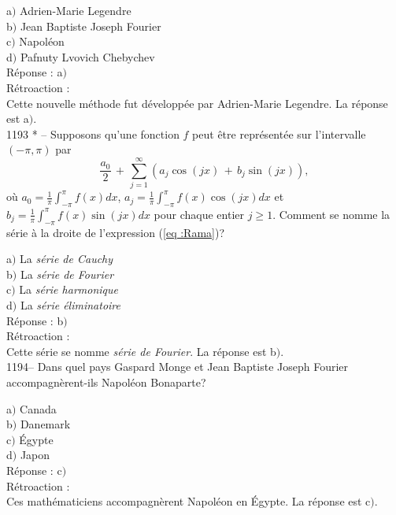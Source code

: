 ﻿\documentclass[letterpaper, 12pt]{article}
\begin{document}
a$)$ Adrien-Marie Legendre \\
b$)$ Jean Baptiste Joseph Fourier \\
c$)$ Napol\'eon \\
d$)$ Pafnuty Lvovich Chebychev\\

R\'eponse : a$)$\\

R\'etroaction : \\
Cette nouvelle m\'ethode fut d\'evelopp\'ee par Adrien-Marie
Legendre.
La r\'eponse est a$)$.\\

1193 * -- Supposons qu'une fonction $f$ peut \^etre repr\'esent\'ee
sur l'intervalle $(-\pi,\pi)$ par
\begin{equation}
\label{eq :Rama}
\displaystyle{\frac{a_0}2\,+\,\sum_{j=1}^{\infty}(a_j\cos(jx)\,+\,b_j\sin(jx)),}
\end{equation}
o\`u $\displaystyle{a_0=\frac1{\pi}\int_{-\pi}^{\pi}f(x)dx}$,
$\displaystyle{a_j=\frac1{\pi}\int_{-\pi}^{\pi}f(x)\cos(jx)dx}$ et
$\displaystyle{b_j=\frac1{\pi}\int_{-\pi}^{\pi}f(x)\sin(jx)dx}$ pour
chaque entier $j\ge1$. Comment se nomme la s\'erie \`a la droite de
l'expression (\ref{eq :Rama})?

a$)$ La {\sl s\'erie de Cauchy} \\
b$)$ La {\sl s\'erie de Fourier} \\
c$)$ La {\sl s\'erie harmonique} \\
d$)$ La {\sl s\'erie \'eliminatoire}\\

R\'eponse : b$)$\\

R\'etroaction : \\
Cette s\'erie se nomme {\sl s\'erie de Fourier}.
La r\'eponse est b$)$.\\

1194-- Dans quel pays Gaspard Monge et Jean Baptiste Joseph Fourier
accompagn\`erent-ils Napol\'eon Bonaparte?

a$)$ Canada \\
b$)$ Danemark \\
c$)$ \'Egypte \\
d$)$ Japon\\

R\'eponse : c$)$\\

R\'etroaction : \\
Ces math\'ematiciens accompagn\`erent Napol\'eon en \'Egypte.
La r\'eponse est c$)$.\\
\end{document}
